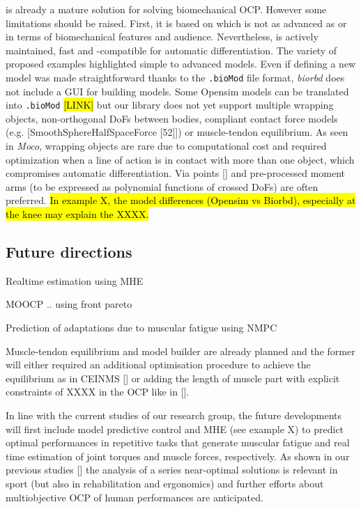 \bioptim is already a mature solution for solving biomechanical OCP. 
However some limitations should be raised. 
First, it is based on  \biorbd which is not as advanced as \opensim or \anybody in terms of biomechanical features and audience.
Nevertheless,  \biorbd is actively maintained, fast and \casadi-compatible for automatic differentiation.
The variety of proposed examples highlighted simple to advanced models.
Even if defining a new model was made straightforward thanks to the \texttt{.bioMod} file format, \textit{biorbd} does not include a GUI for building models. 
Some Opensim models can be translated into \texttt{.bioMod} \hl{[LINK]} but our library does not yet support multiple wrapping objects, non-orthogonal DoFs between bodies, compliant contact force models (e.g. [SmoothSphereHalfSpaceForce [52]]) or muscle-tendon equilibrium. 
As seen in \textit{Moco}, wrapping objects are rare due to computational cost and required optimization when a line of action is in contact with more than one object, which compromises automatic differentiation. 
Via points [\addref] and pre-processed moment arms (to be expressed as polynomial functions of crossed DoFs) are often preferred. 
\hl{In example X, the model differences (Opensim vs Biorbd), especially at the knee may explain the XXXX.} 


\subsection{Future directions}
Realtime estimation using MHE

MOOCP .. using front pareto

Prediction of adaptations due to muscular fatigue using NMPC

Muscle-tendon equilibrium and model builder are already planned and the former will either required an additional optimisation procedure to achieve the equilibrium as in CEINMS [\addref] or adding the length of muscle part with explicit constraints of XXXX in the OCP like in [\addref]. 

In line with the current studies of our research group, the future developments will first include  model predictive control and MHE (see example X) to predict optimal performances in repetitive tasks that generate muscular fatigue and real time estimation of joint torques and muscle forces, respectively. 
As shown in our previous studies [\addref] the analysis of a series near-optimal solutions is relevant in sport (but also in rehabilitation and ergonomics) and further efforts about multiobjective OCP of human performances are anticipated. 
